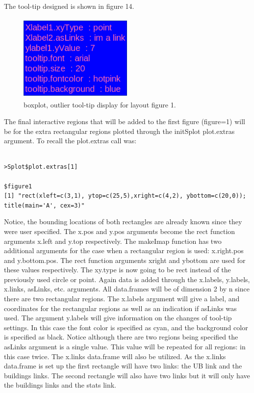 \documentclass[]{article}
\begin{document}
The tool-tip designed is shown in figure 14. 

 
\begin{center}
\begin{figure}
\includegraphics[width=2.2in, height=1.7in]{tip2}
\caption{boxplot, outlier tool-tip display for layout figure 1.}
\end{figure}
\end{center}


The final interactive regions that will be added to the first figure (figure=1) will be for the extra rectangular regions plotted through the initSplot plot.extras argument. To recall the plot.extras call was: 

\begin{verbatim}

>Splot$plot.extras[1]

$figure1
[1] "rect(xleft=c(3,1), ytop=c(25,5),xright=c(4,2), ybottom=c(20,0));
title(main='A', cex=3)"

\end{verbatim}

Notice, the bounding locations of both rectangles are already known since they were user specified. The x.pos and y.pos arguments become the rect function arguments x.left and y.top respectively. The makeImap function has two additional arguments for the case when a rectangular region is used: x.right.pos and y.bottom.pos. The rect function arguments xright and ybottom are used for these values respectively. The xy.type is now going to be rect instead of the previously used circle or point. Again data is added through the x.labels, y.labels, x.links, asLinks, etc. arguments. All data.frames will be of dimension 2 by n since there are two rectangular regions. The x.labels argument will give a label, and coordinates for the rectangular regions as well as an indication if asLinks was used. The argument y.labels will give information on the changes of tool-tip settings. In this case the font color is specified as cyan, and the background color is specified as black. Notice although there are two regions being specified the asLinks argument is a single value. This value will be repeated for all regions: in this case twice. The x.links data.frame will also be utilized. As the x.links data.frame is set up the first rectangle will have two links: the UB link and the buildings links. The second rectangle will also have two links but it will only have the buildings links and the stats link. 
\end{document}
